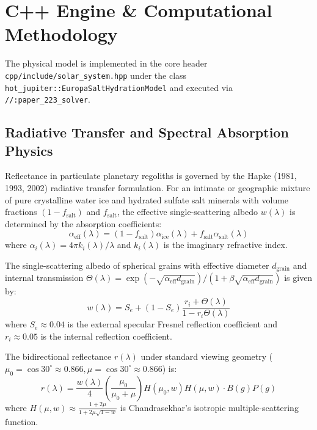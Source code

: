 \documentclass[11pt,a4paper]{article}
\begin{document}
\section{C++ Engine \& Computational Methodology}
The physical model is implemented in the core header \texttt{cpp/include/solar\_system.hpp} under the class \texttt{hot\_jupiter::EuropaSaltHydrationModel} and executed via \texttt{//:paper\_223\_solver}.

\subsection{Radiative Transfer and Spectral Absorption Physics}
Reflectance in particulate planetary regoliths is governed by the Hapke (1981, 1993, 2002) radiative transfer formulation. For an intimate or geographic mixture of pure crystalline water ice and hydrated sulfate salt minerals with volume fractions $(1 - f_{\text{salt}})$ and $f_{\text{salt}}$, the effective single-scattering albedo $w(\lambda)$ is determined by the absorption coefficients:
\begin{equation}
\alpha_{\text{eff}}(\lambda) = (1 - f_{\text{salt}}) \alpha_{\text{ice}}(\lambda) + f_{\text{salt}} \alpha_{\text{salt}}(\lambda)
\end{equation}
where $\alpha_i(\lambda) = 4\pi k_i(\lambda) / \lambda$ and $k_i(\lambda)$ is the imaginary refractive index.

The single-scattering albedo of spherical grains with effective diameter $d_{\text{grain}}$ and internal transmission $\Theta(\lambda) = \exp(-\sqrt{\alpha_{\text{eff}} d_{\text{grain}}}) / (1 + \beta \sqrt{\alpha_{\text{eff}} d_{\text{grain}}})$ is given by:
\begin{equation}
w(\lambda) = S_e + (1 - S_e) \frac{r_i + \Theta(\lambda)}{1 - r_i \Theta(\lambda)}
\end{equation}
where $S_e \approx 0.04$ is the external specular Fresnel reflection coefficient and $r_i \approx 0.05$ is the internal reflection coefficient.

The bidirectional reflectance $r(\lambda)$ under standard viewing geometry ($\mu_0 = \cos 30^\circ \approx 0.866, \mu = \cos 30^\circ \approx 0.866$) is:
\begin{equation}
r(\lambda) = \frac{w(\lambda)}{4} \left(\frac{\mu_0}{\mu_0 + \mu}\right) H(\mu_0, w) H(\mu, w) \cdot B(g) P(g)
\end{equation}
where $H(\mu, w) \approx \frac{1 + 2\mu}{1 + 2\mu\sqrt{1 - w}}$ is Chandrasekhar's isotropic multiple-scattering function.
\end{document}
